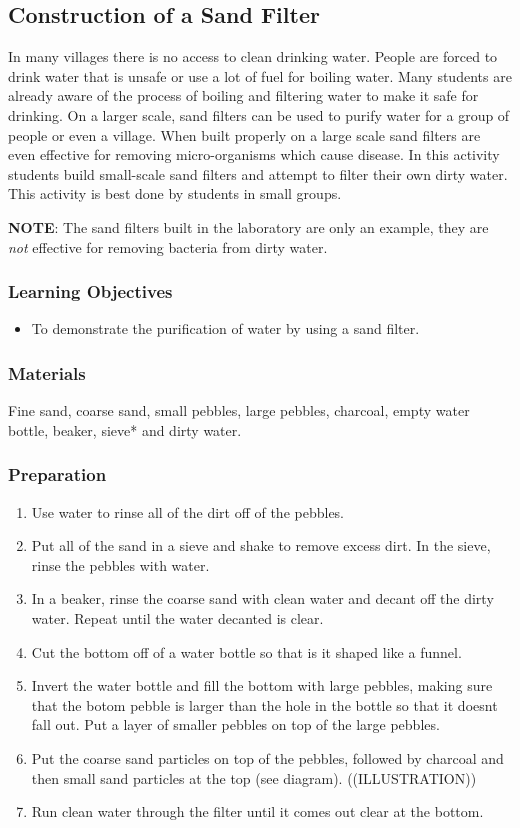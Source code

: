 \subsection{Construction of a Sand Filter}
In many villages there is no access to clean drinking water. People are forced to drink water that is unsafe or use a lot of fuel for boiling water. Many students are already aware of the process of boiling and filtering water to make it safe for drinking. On a larger scale, sand filters can be used to purify water for a group of people or even a village. When built properly on a large scale sand filters are even effective for removing micro-organisms which cause disease. In this activity students build small-scale sand filters and attempt to filter their own dirty water.  This activity is best done by students in small groups.

\textbf{NOTE}: The sand filters built in the laboratory are only an example, they are \textit{not} effective for removing bacteria from dirty water.
\subsubsection*{Learning Objectives}
\begin{itemize}
\item{To demonstrate the purification of water by using a sand filter.}
\end{itemize}

\subsubsection*{Materials}
Fine sand, coarse sand, small pebbles, large pebbles, charcoal, empty water bottle, beaker, sieve* and dirty water.

\subsubsection*{Preparation}
\begin{enumerate}
\item{Use water to rinse all of the dirt off of the pebbles.}
\item{Put all of the sand in a sieve and shake to remove excess dirt. In the sieve, rinse the pebbles with water.}
\item{In a beaker, rinse the coarse sand with clean water and decant off the dirty water. Repeat until the water decanted is clear.}
\item{Cut the bottom off of a water bottle so that is it shaped like a funnel.}
\item{Invert the water bottle and fill the bottom with large pebbles, making sure that the botom pebble is larger than the hole in the bottle so that it doesnt fall out. Put a layer of smaller pebbles on top of the large pebbles.}
\item{Put the coarse sand particles on top of the pebbles, followed by charcoal and then small sand particles at the top (see diagram).}
((ILLUSTRATION))
\item{Run clean water through the filter until it comes out clear at the bottom.}
\end{enumerate}

